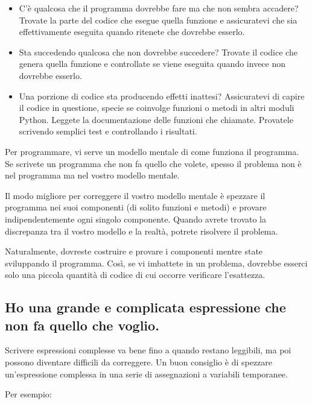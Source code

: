 \documentclass[10pt]{book}
\begin{document}
\begin{itemize}

\item C'è qualcosa che il programma dovrebbe fare ma che non sembra accadere? Trovate la parte del codice che esegue quella funzione e assicuratevi che sia effettivamente eseguita quando ritenete che dovrebbe esserlo.

\item Sta succedendo qualcosa che non dovrebbe succedere? Trovate il codice che genera quella funzione e controllate se viene eseguita quando invece non dovrebbe esserlo.

\item Una porzione di codice sta producendo effetti inattesi? Assicuratevi di capire il codice in questione, specie se coinvolge funzioni o metodi in altri moduli Python. Leggete la documentazione delle funzioni che chiamate. Provatele scrivendo semplici test e controllando i risultati.

\end{itemize}

Per programmare, vi serve un modello mentale di come funziona il programma. Se scrivete un programma che non fa quello che volete, spesso il problema non è nel programma ma nel vostro modello mentale.

Il modo migliore per correggere il vostro modello mentale è spezzare il programma nei suoi componenti (di solito funzioni e metodi) e provare indipendentemente ogni singolo componente.
Quando avrete trovato la discrepanza tra il vostro modello e la realtà, potrete risolvere il problema.

Naturalmente, dovreste costruire e provare i componenti mentre state sviluppando il programma. Così, se vi imbattete in un problema, dovrebbe esserci solo una piccola quantità di codice di cui occorre verificare l'esattezza.


\subsection{Ho una grande e complicata espressione che non fa quello che voglio.}

Scrivere espressioni complesse va bene fino a quando restano leggibili, ma poi possono diventare difficili da correggere. Un buon consiglio è di spezzare un'espressione complessa in una serie di assegnazioni a variabili temporanee.

Per esempio:
\end{document}
